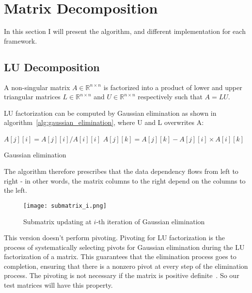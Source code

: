 \chapter{Matrix Decomposition}
\label{matrix_decomposition}
In this section I will present the algorithm, and different implementation for each framework.
\section{LU Decomposition}
A non-singular matrix $A \in \mathbb{R}^{n \times n}$ is factorized into a product of lower and upper triangular matrices $L \in \mathbb{R}^{n \times n}$ and $U \in \mathbb{R}^{n \times n}$ respectively such that $A = LU$.

LU factorization can be computed by Gaussian elimination as
shown in algorithm~\ref{alg:gaussian_elimination}, where U and L overwrites A:

\begin{algorithm}
\begin{algorithmic}
		\State $A[j][i] = A[j][i] / A[i][i]$ 
	\EndFor
			\State $A[j][k] = A[j][k] - A[j][i] \times A[i][k]$ 
		\EndFor	
	\EndFor
\EndFor
\end{algorithmic}
\caption{Gaussian elimination}
\label{alg:gaussian_elimination}
\end{algorithm}

The algorithm therefore prescribes that the data dependency flows from left to right - in other words, the matrix columns to the right depend on the columns to the left. 

\begin{figure}[H]
\centering
\texttt{[image: submatrix\_i.png]}
\caption{Submatrix updating at $i$-th iteration of Gaussian elimination}
\end{figure}


This version doesn't perform pivoting. Pivoting for LU factorization is the process of systematically selecting pivots for Gaussian elimination
during the LU factorization of a matrix. This guarantees that the elimination process goes to completion, ensuring that there is a nonzero pivot at every step of the elimination process. The pivoting is not necessary if the matrix is positive definite~\cite{upenn_lu_positive_definite}. So our test matrices will have this property.



